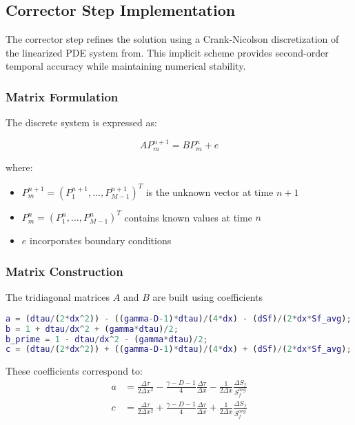 \documentclass{article}
\begin{document}
\subsection{Corrector Step Implementation}
\label{subsec:corrector}

The corrector step refines the solution using a Crank-Nicolson discretization of the linearized PDE system from. This implicit scheme provides second-order temporal accuracy while maintaining numerical stability.

\subsubsection{Matrix Formulation}
The discrete system is expressed as:

\begin{equation}
AP_{m}^{n+1} = BP_{m}^{n} + e
\label{eq:matrix_system}
\end{equation}

where:
\begin{itemize}
\item $P_{m}^{n+1} = (P_{1}^{n+1}, \ldots, P_{M-1}^{n+1})^{T}$ is the unknown vector at time $n+1$
\item $P_{m}^{n} = (P_{1}^{n}, \ldots, P_{M-1}^{n})^{T}$ contains known values at time $n$
\item $e$ incorporates boundary conditions
\end{itemize}

\subsubsection{Matrix Construction}
The tridiagonal matrices $A$ and $B$ are built using coefficients
\begin{lstlisting}[language=Matlab,caption={Matrix coefficient computation},label=code:coefficients]
% Spatial and temporal weights
a = (dtau/(2*dx^2)) - ((gamma-D-1)*dtau)/(4*dx) - (dSf)/(2*dx*Sf_avg);
b = 1 + dtau/dx^2 + (gamma*dtau)/2;
b_prime = 1 - dtau/dx^2 - (gamma*dtau)/2;
c = (dtau/(2*dx^2)) + ((gamma-D-1)*dtau)/(4*dx) + (dSf)/(2*dx*Sf_avg);
\end{lstlisting}

These coefficients correspond to:
\begin{align}
a &= \frac{\Delta\tau}{2\Delta x^2} - \frac{\gamma - D - 1}{4}\frac{\Delta\tau}{\Delta x} - \frac{1}{2\Delta x}\frac{\Delta S_f}{S_f^{avg}} \label{eq:coeff_a}\\
c &= \frac{\Delta\tau}{2\Delta x^2} + \frac{\gamma - D - 1}{4}\frac{\Delta\tau}{\Delta x} + \frac{1}{2\Delta x}\frac{\Delta S_f}{S_f^{avg}} \label{eq:coeff_c}
\end{align}
\end{document}
